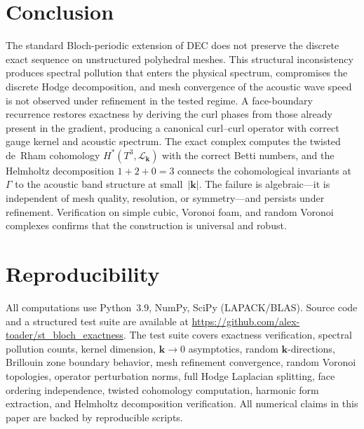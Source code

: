 \documentclass[preprint,12pt]{elsarticle}
\begin{document}
\section{Conclusion}
\label{sec:conclusion}

The standard Bloch-periodic extension of DEC does not preserve the discrete exact sequence on unstructured polyhedral meshes. This structural inconsistency produces spectral pollution that enters the physical spectrum, compromises the discrete Hodge decomposition, and mesh convergence of the acoustic wave speed is not observed under refinement in the tested regime. A face-boundary recurrence restores exactness by deriving the curl phases from those already present in the gradient, producing a canonical curl--curl operator with correct gauge kernel and acoustic spectrum. The exact complex computes the twisted de~Rham cohomology $H^*(T^3, \mathcal{L}_\mathbf{k})$ with the correct Betti numbers, and the Helmholtz decomposition $1{+}2{+}0 = 3$ connects the cohomological invariants at~$\Gamma$ to the acoustic band structure at small~$|\mathbf{k}|$. The failure is algebraic---it is independent of mesh quality, resolution, or symmetry---and persists under refinement. Verification on simple cubic, Voronoi foam, and random Voronoi complexes confirms that the construction is universal and robust.

\section*{Reproducibility}

All computations use Python~3.9, NumPy, SciPy (LAPACK/BLAS). Source code and a structured test suite are available at \url{https://github.com/alex-toader/st_bloch_exactness}. The test suite covers exactness verification, spectral pollution counts, kernel dimension, $\mathbf{k} \to 0$ asymptotics, random $\mathbf{k}$-directions, Brillouin zone boundary behavior, mesh refinement convergence, random Voronoi topologies, operator perturbation norms, full Hodge Laplacian splitting, face ordering independence, twisted cohomology computation, harmonic form extraction, and Helmholtz decomposition verification. All numerical claims in this paper are backed by reproducible scripts.
\end{document}
